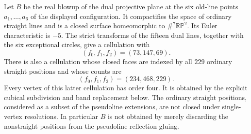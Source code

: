 \begin{proposition}\label{prop:straight-blowup}
Let $B$ be the real blowup of the dual projective plane at the six
old-line points $a_1,\ldots,a_6$ of the displayed configuration.
It compactifies the space of ordinary straight lines and is a
closed surface homeomorphic to $\#^7\mathbb {RP}^2$.
Its Euler characteristic is $-5$. The strict transforms of the
fifteen dual lines, together with the six exceptional circles,
give a cellulation with
\[
 (f_0,f_1,f_2)=(73,147,69).
\]
There is also a cellulation whose closed faces are indexed by all
$229$ ordinary straight positions and whose counts are
\[
 (f_0,f_1,f_2)=(234,468,229).
\]
Every vertex of this latter cellulation has order four. It is obtained
by the explicit cubical subdivision and band replacement below.
The ordinary straight positions, considered as a subset of the
pseudoline extensions, are not closed under single-vertex resolutions.
In particular $B$ is not obtained by merely discarding the nonstraight
positions from the pseudoline reflection gluing.
\end{proposition}
